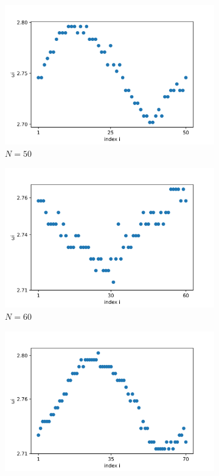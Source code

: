 \documentclass[a4paper,12pt]{article}
\begin{document}
\begin{figure}[H]
\begin{subfigure}{.32\textwidth}
  \centering
  \includegraphics[width=1\linewidth]{w_N=50.png}  
  \caption{$N=50$}
\end{subfigure}
\hfill
\begin{subfigure}{.32\textwidth}
  \centering
  \includegraphics[width=1\linewidth]{w_N=60.png}  
  \caption{$N=60$}
\end{subfigure}
\hfill
\begin{subfigure}{.32\textwidth}
  \centering
  \includegraphics[width=1\linewidth]{w_N=70.png}  

\end{subfigure}
\end{figure}
\end{document}

